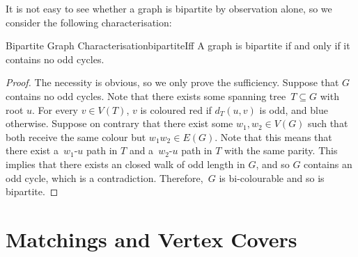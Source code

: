 \documentclass[math]{amznotes}
\theoremstyle{remark}
\begin{document}
It is not easy to see whether a graph is bipartite by observation alone, so we consider the following characterisation:
\begin{thmbox}{Bipartite Graph Characterisation}{bipartiteIff}
    A graph is bipartite if and only if it contains no odd cycles.
    \tcblower
    \begin{proof}
        The necessity is obvious, so we only prove the sufficiency. Suppose that $G$ contains no odd cycles. Note that there exists some spanning tree~$T \subseteq G$ with root $u$. For every $v \in V(T)$, $v$ is coloured red if $d_T(u, v)$ is odd, and blue otherwise. Suppose on contrary that there exist some $w_1, w_2 \in V(G)$ such that both receive the same colour but $w_1w_2 \in E(G)$. Note that this means that there exist a~$w_1$-$u$ path in $T$ and a~$w_2$-$u$ path in $T$ with the same parity. This implies that there exists an closed walk of odd length in $G$, and so $G$ contains an odd cycle, which is a contradiction. Therefore,~$G$ is bi-colourable and so is bipartite.
    \end{proof}
\end{thmbox}

\chapter{Matchings and Vertex Covers}
\end{document}
